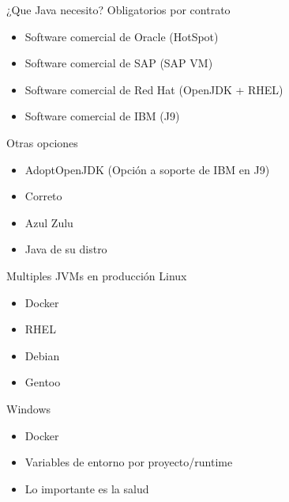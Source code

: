 \documentclass[aspectratio=169]{beamer}
\begin{document}
\begin{frame}[fragile]{¿Que Java necesito?}
    Obligatorios por contrato
    \begin{itemize}
        \item Software comercial de Oracle (HotSpot)
        \item Software comercial de SAP (SAP VM)
        \item Software comercial de Red Hat (OpenJDK + RHEL)
        \item Software comercial de IBM (J9)
    \end{itemize}
    Otras opciones
\begin{itemize}
    \item AdoptOpenJDK (Opción a soporte de IBM en J9)
    \item Correto
    \item Azul Zulu
    \item Java de su distro
\end{itemize}
\end{frame}

\begin{frame}[fragile]{Multiples JVMs en producción}
    Linux
    \begin{itemize}
        \item Docker
        \item RHEL
        \item Debian
        \item Gentoo
    \end{itemize}
    Windows
    \begin{itemize}
        \item Docker
        \item Variables de entorno por proyecto/runtime
        \item Lo importante es la salud
    \end{itemize}
\end{frame}
\end{document}
